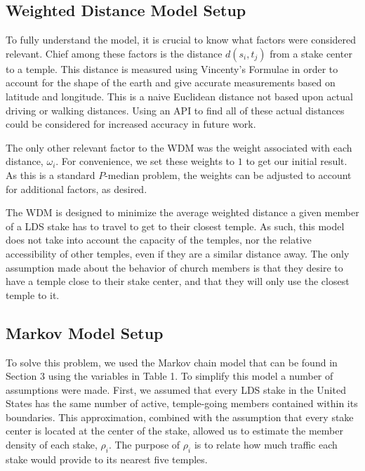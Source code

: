 \documentclass[twoside,twocolumn]{article}
\begin{document}
\subsection{Weighted Distance Model Setup}

To fully understand the model, it is crucial to know what factors were considered relevant.
Chief among these factors is the distance $d(s_i,t_j)$ from a stake center to a temple. %
This distance is measured using Vincenty's Formulae in order to account for the shape of the earth and give accurate measurements based on latitude and longitude. %
This is a naive Euclidean distance not based upon actual driving or walking distances.
Using an API to find all of these actual distances could be considered for increased accuracy in future work.

The only other relevant factor to the WDM was the weight associated with each distance, $\omega_i$. %
For convenience, we set these weights to $1$ to get our initial result.
As this is a standard $P$-median problem, the weights can be adjusted to account for additional factors, as desired.

The WDM is designed to minimize the average weighted distance a given member of a LDS stake has to travel to get to their closest temple.
As such, this model does not take into account the capacity of the temples, nor the relative accessibility of other temples, even if they are a similar distance away.
The only assumption made about the behavior of church members is that they desire to have a temple close to their stake center, and that they will only use the closest temple to it. %

\subsection{Markov Model Setup}

To solve this problem, we used the Markov chain model that can be found in Section 3 using the variables in Table 1.
To simplify this model a number of assumptions were made.
First, we assumed that every LDS stake in the United States has the same number of active, temple-going members contained within its boundaries.
This approximation, combined with the assumption that every stake center is located at the center of the stake, allowed us to estimate the member density of each stake, $\rho_i$.
The purpose of $\rho_{i}$ is to relate how much traffic each stake would provide to its nearest five temples. %
\end{document}

